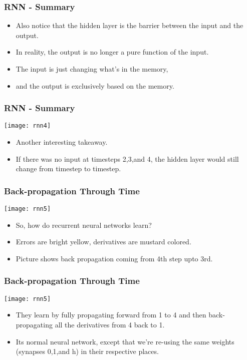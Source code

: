 \begin{frame}[fragile] \frametitle{RNN - Summary}
\begin{itemize}
\item Also notice that the hidden layer is the barrier between the input and the output. 
\item In reality, the output is no longer a pure function of the input. 
\item The input is just changing what's in the memory, 
\item and the output is exclusively based on the memory. 
\end{itemize}
\end{frame}

\begin{frame}[fragile] \frametitle{RNN - Summary}
\begin{center}
\texttt{[image: rnn4]}
\end{center}
\begin{itemize}
\item Another interesting takeaway. 
\item If there was no input at timesteps 2,3,and 4, the hidden layer would still change from timestep to timestep. 
\end{itemize}
\end{frame}

\begin{frame}[fragile] \frametitle{Back-propagation Through Time}
\begin{center}
\texttt{[image: rnn5]}
\end{center}
\begin{itemize}
\item So, how do recurrent neural networks learn? 
\item Errors are bright yellow, derivatives are mustard colored.
\item Picture shows back propagation coming from 4th step upto 3rd.
\end{itemize}
\end{frame}

\begin{frame}[fragile] \frametitle{Back-propagation Through Time}
\begin{center}
\texttt{[image: rnn5]}
\end{center}
\begin{itemize}
\item They learn by fully propagating forward from 1 to 4 and then back-propagating all the derivatives from 4 back to 1. 
\item Its normal neural network, except that we're re-using the same weights (synapses 0,1,and h) in their respective places. 
\end{itemize}
\end{frame}


